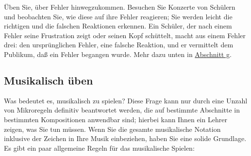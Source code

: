 Üben Sie, über Fehler hinwegzukommen.
Besuchen Sie Konzerte von Schülern und beobachten Sie, wie diese auf ihre Fehler reagieren; Sie werden leicht die richtigen und die falschen Reaktionen erkennen.
Ein Schüler, der nach einem Fehler seine Frustration zeigt oder seinen Kopf schüttelt, macht aus einem Fehler drei: den ursprünglichen Fehler, eine falsche Reaktion, und er vermittelt dem Publikum, daß ein Fehler begangen wurde.
Mehr dazu unten in \hyperref[c1iii14g]{Abschnitt g}.


\hypertarget{c1iii14musikalisch}{}
\subsection{Musikalisch üben}
\label{c1iii14d}

Was bedeutet es, musikalisch zu spielen?
Diese Frage kann nur durch eine Unzahl von Mikroregeln definitiv beantwortet werden, die auf bestimmte Abschnitte in bestimmten Kompositionen anwendbar sind; hierbei kann Ihnen ein Lehrer zeigen, was Sie tun müssen.
Wenn Sie die gesamte musikalische Notation inklusive der Zeichen in Ihre Musik einbeziehen, haben Sie eine solide Grundlage.
Es gibt ein paar allgemeine Regeln für das musikalische Spielen:

